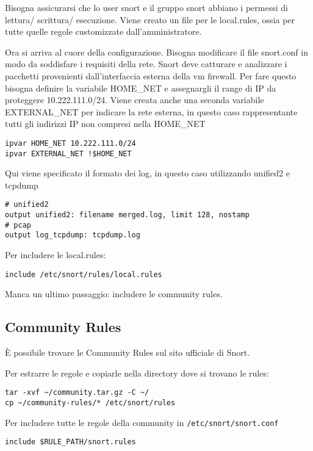 Bisogna assicurarsi che lo user snort e il gruppo snort abbiano i permessi di lettura/ scrittura/ esecuzione.
Viene creato un file per le local.rules, ossia per tutte quelle regole customizzate dall'amministratore.

Ora si arriva al cuore della configurazione. Bisogna modificare il file snort.conf in modo da soddisfare i requisiti della rete.
Snort deve catturare e analizzare i pacchetti provenienti dall'interfaccia esterna della vm firewall. Per fare questo bisogna definire la variabile HOME\_NET e assegnargli il range di IP da proteggere 10.222.111.0/24. Viene creata anche una seconda variabile EXTERNAL\_NET per indicare la rete esterna, in questo caso rappresentante tutti gli indirizzi IP non compresi nella HOME\_NET

\begin{verbatim}
ipvar HOME_NET 10.222.111.0/24
ipvar EXTERNAL_NET !$HOME_NET
\end{verbatim}

Qui viene specificato il formato dei log, in questo caso utilizzando unified2 e tcpdump

\begin{verbatim}
# unified2
output unified2: filename merged.log, limit 128, nostamp
# pcap
output log_tcpdump: tcpdump.log
\end{verbatim}

Per includere le local.rules:

\begin{verbatim}
include /etc/snort/rules/local.rules
\end{verbatim}

Manca un ultimo passaggio: includere le community rules.

\subsection{Community Rules}


È possibile trovare le Community Rules sul sito ufficiale di Snort.


Per estrarre le regole e copiarle nella directory dove si trovano le rules:

\begin{verbatim}
tar -xvf ~/community.tar.gz -C ~/
cp ~/community-rules/* /etc/snort/rules
\end{verbatim}

Per includere tutte le regole della community in \texttt{/etc/snort/snort.conf}

\begin{verbatim}
include $RULE_PATH/snort.rules
\end{verbatim}

